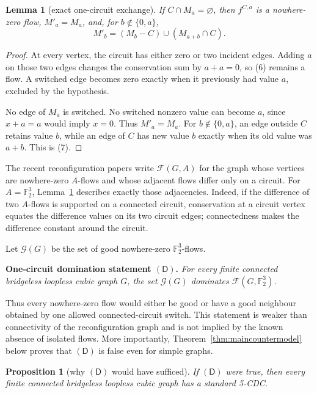 \documentclass[11pt]{article}
\newtheorem{proposition}[theorem]{Proposition}
\newtheorem{lemma}[theorem]{Lemma}
\theoremstyle{definition}
\theoremstyle{remark}
\newcommand{\F}{\mathbb F}
\newcommand{\Good}{\mathcal G}
\begin{document}
\begin{lemma}[exact one-circuit exchange]\label{lem:switch}
If \(C\cap M_a=\varnothing\), then \(f^{C,a}\) is a nowhere-zero flow,
\(M'_a=M_a\), and, for \(b\notin\{0,a\}\),
\[
 M'_b=(M_b-C)\cup(M_{a+b}\cap C).                  \tag{7}
\]
\end{lemma}

\begin{proof}
At every vertex, the circuit has either zero or two incident edges.
Adding \(a\) on those two edges changes the conservation sum by
\(a+a=0\), so (6) remains a flow.  A switched edge becomes zero exactly
when it previously had value \(a\), excluded by the hypothesis.

No edge of \(M_a\) is switched.  No switched nonzero value can become
\(a\), since \(x+a=a\) would imply \(x=0\).  Thus \(M'_a=M_a\).  For
\(b\notin\{0,a\}\), an edge outside \(C\) retains value \(b\), while an
edge of \(C\) has new value \(b\) exactly when its old value was \(a+b\).
This is (7).
\end{proof}

The recent reconfiguration papers \cite{esperet2025,cranston2026} write
\(\mathcal F(G,A)\) for the graph whose vertices are nowhere-zero
\(A\)-flows and whose adjacent flows differ only on a circuit.  For
\(A=\F_2^3\), Lemma~\ref{lem:switch} describes exactly those adjacencies.
Indeed, if the difference of two \(A\)-flows is supported on a connected
circuit, conservation at a circuit vertex equates the difference values
on its two circuit edges; connectedness makes the difference constant
around the circuit.

Let \(\Good(G)\) be the set of good nowhere-zero \(\F_2^3\)-flows.

\medskip
\noindent
\textbf{One-circuit domination statement \((\mathsf D)\).}
\emph{For every finite connected bridgeless loopless cubic graph \(G\),
the set \(\Good(G)\) dominates \(\mathcal F(G,\F_2^3)\).}

Thus every nowhere-zero flow would either be good or have a good
neighbour obtained by one allowed connected-circuit switch.  This
statement is weaker than connectivity of the reconfiguration graph and
is not implied by the known absence of isolated flows.  More importantly,
Theorem~\ref{thm:maincountermodel} below proves that \((\mathsf D)\) is
false even for simple graphs.

\begin{proposition}[why \((\mathsf D)\) would have sufficed]
\label{prop:conditional}
If \((\mathsf D)\) were true, then every finite connected
bridgeless loopless cubic graph has a standard 5-CDC.
\end{proposition}
\end{document}
